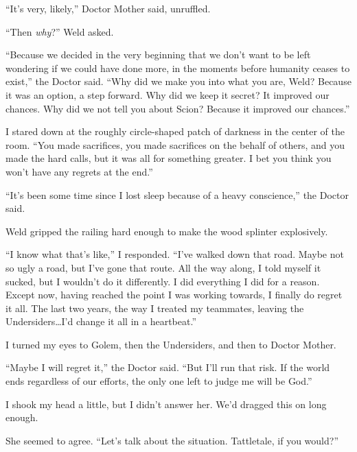 ``It's very, likely,'' Doctor Mother said, unruffled.



``Then \emph{why}?'' Weld asked.



``Because we decided in the very beginning that we don't want to be left wondering if we could have done more, in the moments before humanity ceases to exist,'' the Doctor said.  ``Why did we make you into what you are, Weld?  Because it was an option, a step forward.  Why did we keep it secret?  It improved our chances.  Why did we not tell you about Scion?  Because it improved our chances.''



I stared down at the roughly circle-shaped patch of darkness in the center of the room.  ``You made sacrifices, you made sacrifices on the behalf of others, and you made the hard calls, but it was all for something greater.  I bet you think you won't have any regrets at the end.''



``It's been some time since I lost sleep because of a heavy conscience,'' the Doctor said.



Weld gripped the railing hard enough to make the wood splinter explosively.



``I know what that's like,'' I responded.  ``I've walked down that road.  Maybe not so ugly a road, but I've gone that route.  All the way along, I told myself it sucked, but I wouldn't do it differently.  I did everything I did for a reason.  Except now, having reached the point I was working towards, I finally do regret it all.  The last two years, the way I treated my teammates, leaving the Undersiders\ldots I'd change it all in a heartbeat.''



I turned my eyes to Golem, then the Undersiders, and then to Doctor Mother.



``Maybe I will regret it,'' the Doctor said.  ``But I'll run that risk.  If the world ends regardless of our efforts, the only one left to judge me will be God.''



I shook my head a little, but I didn't answer her.  We'd dragged this on long enough.



She seemed to agree.  ``Let's talk about the situation.  Tattletale, if you would?''



